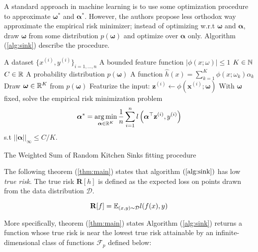 \documentclass{article}
\DeclareMathOperator*{\argmin}{arg\,min}
\begin{document}
    
    
    A standard approach in machine learning is to use some optimization procedure to approximate $\bm{\omega}^*$ and $\bm{\alpha}^*$. However, the authors propose less orthodox way approximate the empirical risk minimizer; instead of optimizing w.r.t $\bm{\omega}$ and $\bm{\alpha}$, draw $\bm{\omega}$ from some distribution $p(\bm{\omega})$ and optimize over $\bm{\alpha}$ only. Algorithm (\ref{alg:sink}) describe the procedure. 


    \begin{algorithm}[H]
    	\begin{algorithmic}
    		\REQUIRE A dataset $\{x^{(i)}, y^{(i)}\}_{i=1,...,n}$
    		\REQUIRE A bounded feature function $|\phi(x;\omega)|\leq 1$
    		\REQUIRE $K\in \mathbb{N}$
    		\REQUIRE $C\in \mathbb{R}$
    		\REQUIRE A probability distribution $p(\bm{\omega})$
    		\ENSURE A function $\hat{h}(x)=\sum_{k=1}^K\phi(x;\omega_k)\alpha_k$
    		\STATE Draw $\bm{\omega}\in\mathbb{R}^K$ from $p(\bm{\omega})$
    		\STATE Featurize the input: $\mathbf{z}^{(i)}\leftarrow \phi(\mathbf{x}^{(i)};\bm{\omega})$
    		\STATE With $\bm{\omega}$ fixed,  solve the empirical risk minimization problem
    		\begin{equation}
    		    \bm{\alpha}^* =
                \argmin_{\bm{\alpha} \in \reals^K}
                \frac{1}{n}\sum_{i=1}^n l\left(\bm{\alpha}^\top\mathbf{z}^{(i)}, y^{(i)}\right)
    		\end{equation}
    		s.t $||\bm{\alpha}||_{\infty}\leq C / K$.
    	\end{algorithmic}
    	\caption{The Weighted Sum of Random Kitchen Sinks fitting procedure}
    	\label{alg:sink}
    \end{algorithm}

    The following theorem (\ref{thm:main}) states that algorithm $(\ref{alg:sink})$ has low \textit{true risk}. The true risk $\mathbf{R}[h]$ is defined as the expected loss on points drawn from the data distribution $\mathcal{D}$.
    
    \begin{equation}
        \mathbf{R}[f] = \mathbb{E}_{(x,y)\sim \mathcal{D}} l(f(x), y)
    \end{equation}
    
    More specifically, theorem (\ref{thm:main}) states Algorithm (\ref{alg:sink}) returns a function whose true risk is near the lowest true risk attainable by an infinite-dimensional class of functions $\mathcal{F}_p$ defined below:
\end{document}
